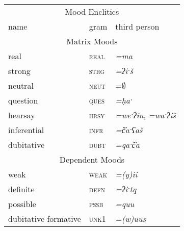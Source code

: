 \begin{table}[ht]
\centering
\label{table:moods}
\begin{tabular}{lll}
\multicolumn{3}{c}{Mood Enclitics}                                                                                           \\
name                                       & gram                         & third person                           \\ \hline
\multicolumn{3}{|c|}{Matrix Moods}       \\ \hline
\multicolumn{1}{|l|}{real}               & \multicolumn{1}{l|}{\textsc{real}} & \multicolumn{1}{l|}{\textit{=ma}}             \\ \hline
\multicolumn{1}{|l|}{strong}                 & \multicolumn{1}{l|}{\textsc{strg}} & \multicolumn{1}{l|}{\textit{=ʔiˑš}}            \\ \hline
\multicolumn{1}{|l|}{neutral}              & \multicolumn{1}{l|}{\textsc{neut}} & \multicolumn{1}{l|}{=$\emptyset$\footnotemark}       \\ \hline
\multicolumn{1}{|l|}{question}             & \multicolumn{1}{l|}{\textsc{ques}} & \multicolumn{1}{l|}{\textit{=ḥaˑ}}             \\ \hline
\multicolumn{1}{|l|}{hearsay}              & \multicolumn{1}{l|}{\textsc{hrsy}} & \multicolumn{1}{l|}{\textit{=weˑʔin}, \textit{=waˑʔiš}} \\ \hline
\multicolumn{1}{|l|}{inferential}        & \multicolumn{1}{l|}{\textsc{infr}} & \multicolumn{1}{l|}{\textit{=č̓aˑʕaš}}        \\ \hline
\multicolumn{1}{|l|}{dubitative}           & \multicolumn{1}{l|}{\textsc{dubt}} & \multicolumn{1}{l|}{\textit{=qaˑč̓a}}          \\ \hline
\multicolumn{3}{|c|}{Dependent Moods} \\ \hline
\multicolumn{1}{|l|}{weak}                 & \multicolumn{1}{l|}{\textsc{weak}} & \multicolumn{1}{l|}{\textit{=(y)ii}}            \\ \hline
\multicolumn{1}{|l|}{definite}             & \multicolumn{1}{l|}{\textsc{defn}} & \multicolumn{1}{l|}{\textit{=ʔiˑtq}}            \\ \hline
\multicolumn{1}{|l|}{possible}             & \multicolumn{1}{l|}{\textsc{pssb}} & \multicolumn{1}{l|}{\textit{=quu}}              \\ \hline
\multicolumn{1}{|l|}{dubitative formative} & \multicolumn{1}{l|}{\textsc{unk1}} & \multicolumn{1}{l|}{\textit{=(w)uus}}           \\ \hline

\end{tabular}
\end{table}
